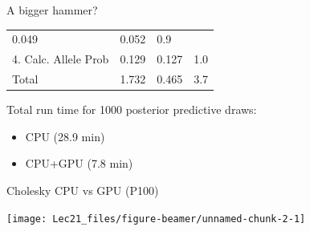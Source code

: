 \documentclass[11pt,ignorenonframetext,]{beamer}
\providecommand{\tightlist}{%
  \setlength{\itemsep}{0pt}\setlength{\parskip}{0pt}}
\begin{document}
\begin{frame}{A bigger hammer?}
\begin{longtable}[]{@{}llll@{}}
\begin{minipage}[t]{0.15\columnwidth}
0.049\strut
\end{minipage} & \begin{minipage}[t]{0.19\columnwidth}\raggedright
0.052\strut
\end{minipage} & \begin{minipage}[t]{0.13\columnwidth}\raggedright
0.9\strut
\end{minipage}\tabularnewline
\begin{minipage}[t]{0.41\columnwidth}\raggedright
4. Calc. Allele Prob\strut
\end{minipage} & \begin{minipage}[t]{0.15\columnwidth}\raggedright
0.129\strut
\end{minipage} & \begin{minipage}[t]{0.19\columnwidth}\raggedright
0.127\strut
\end{minipage} & \begin{minipage}[t]{0.13\columnwidth}\raggedright
1.0\strut
\end{minipage}\tabularnewline
\begin{minipage}[t]{0.41\columnwidth}\raggedright
Total\strut
\end{minipage} & \begin{minipage}[t]{0.15\columnwidth}\raggedright
1.732\strut
\end{minipage} & \begin{minipage}[t]{0.19\columnwidth}\raggedright
0.465\strut
\end{minipage} & \begin{minipage}[t]{0.13\columnwidth}\raggedright
3.7\strut
\end{minipage}\tabularnewline
\bottomrule
\end{longtable}

\normalsize

Total run time for 1000 posterior predictive draws:

\begin{itemize}
\tightlist
\item
  CPU (28.9 min)
\item
  CPU+GPU (7.8 min)
\end{itemize}

\end{frame}

\begin{frame}{Cholesky CPU vs GPU (P100)}
\protect\hypertarget{cholesky-cpu-vs-gpu-p100}{}

\begin{center}\texttt{[image: Lec21\_files/figure-beamer/unnamed-chunk-2-1]} \end{center}

\end{frame}
\end{document}
